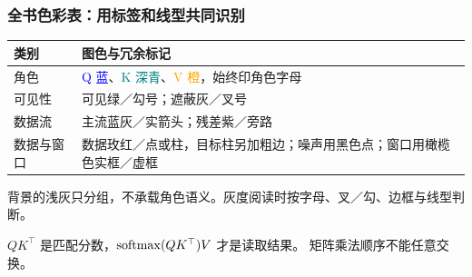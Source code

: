 \subsubsection*{全书色彩表：用标签和线型共同识别}
\label{app:color-semantics}
\begin{center}\small
{}
\begin{tabularx}{\linewidth}{@{}p{26mm}X@{}}\toprule
类别 & 图色与冗余标记\\\midrule
角色 & \textcolor{blue}{Q 蓝}、\textcolor{teal}{K 深青}、\textcolor{orange}{V 橙}，始终印角色字母\\
可见性 & \textcolor{visiblecolor}{可见绿／勾号}；\textcolor{maskedcolor}{遮蔽灰／叉号}\\
数据流 & \textcolor{flowcolor}{主流蓝灰／实箭头}；\textcolor{residualcolor}{残差紫／旁路}\\
数据与窗口 & \textcolor{datacolor}{数据玫红／点或柱}，目标柱另加粗边；噪声用黑色点；窗口用橄榄色实框／虚框\\
\bottomrule\end{tabularx}
\end{center}
背景的浅灰只分组，不承载角色语义。灰度阅读时按字母、叉／勾、边框与线型判断。

\begin{warningbox}
$QK^\top$ 是匹配分数，$\operatorname{softmax}(QK^\top)V$ 才是读取结果。
矩阵乘法顺序不能任意交换。
\end{warningbox}
